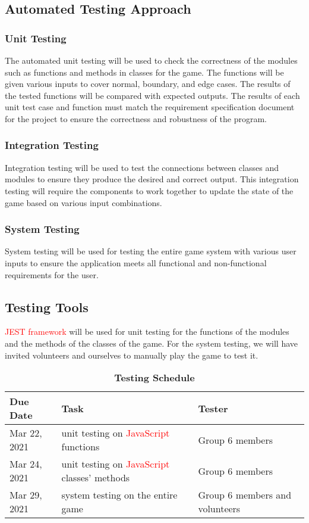 \documentclass[12pt, titlepage]{article}
\begin{document}
\subsection{Automated Testing Approach}
\subsubsection{Unit Testing}
The automated unit testing will be used to check the correctness of the modules such as functions and methods in classes for the game. The functions will be given various inputs to cover normal, boundary, and edge cases. The results of the tested functions will be compared with expected outputs. The results of each unit test case and function must match the requirement specification document for the project to ensure the correctness and robustness of the program.

\subsubsection{Integration Testing}
Integration testing will be used to test the connections between classes and modules to ensure they produce the desired and correct output. This integration testing will require the components to work together to update the state of the game based on various input combinations.

\subsubsection{System Testing}
System testing will be used for testing the entire game system with various user inputs to ensure the application meets all functional and non-functional requirements for the user.

\subsection{Testing Tools}
\textcolor{red}{JEST framework} will be used for unit testing for the functions of the modules and the methods of the classes of the game. For the system testing, we will have invited volunteers and ourselves to manually play the game to test it.


\begin{table}[hbp]
\caption{\textbf{Testing Schedule}} \label{Table}
\begin{tabularx}{\textwidth}{| X | X | X |} 
\hline
Due Date & Task & Tester \\ \hline
 Mar 22, 2021 & unit testing on \textcolor{red}{JavaScript} functions & Group 6 members \\ \hline
 Mar 24, 2021 & unit testing on \textcolor{red}{JavaScript} classes' methods  & Group 6 members \\ \hline
 Mar 29, 2021 & system testing on the entire game & Group 6 members and volunteers \\
\hline
\end{tabularx}
\end{table}
\end{document}
